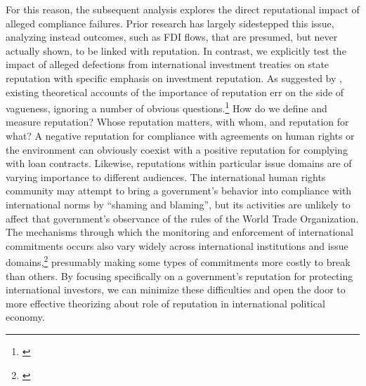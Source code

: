 \documentclass[12pt,onesided]{amsart}
\begin{document}
For this reason, the subsequent analysis explores the direct reputational impact of alleged compliance failures. Prior research has largely sidestepped this issue, analyzing instead outcomes, such as FDI flows, that are presumed, but never actually shown, to be linked with reputation. In contrast, we explicitly test the impact of alleged defections from international investment treaties on state reputation with specific emphasis on investment reputation. As suggested by \citeauthor{brewster:2009}, existing theoretical accounts of the importance of reputation err on the side of vagueness, ignoring a number of obvious questions.\footnote{\citet{brewster:2009}} How do we define and measure reputation? Whose reputation matters, with whom, and reputation for what? A negative reputation for compliance with agreements on human rights or the environment can obviously coexist with a positive reputation for complying with loan contracts. Likewise, reputations within particular issue domains are of varying importance to different audiences. The international human rights community may attempt to bring a government's behavior into compliance with international norms by ``shaming and blaming'', but its activities are unlikely to affect that government's observance of the rules of the World Trade Organization. The mechanisms through which the monitoring and enforcement of international commitments occurs also vary widely across international institutions and issue domains,\footnote{\citet{gaukordger:gordon:2012}} presumably making some types of commitments more costly to break than others. By focusing specifically on a government's reputation for protecting international investors, we can minimize these difficulties and open the door to more effective theorizing about role of reputation in international political economy.
\end{document}
